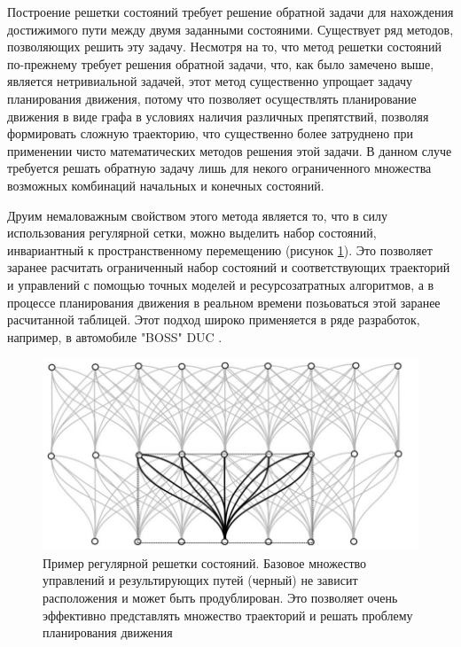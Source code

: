 Построение решетки состояний требует решение обратной задачи для нахождения достижимого пути между двумя заданными
состояними. Существует ряд методов, позволяющих решить эту задачу. Несмотря на то, что метод решетки состояний по-прежнему
требует решения обратной задачи, что, как было замечено выше, является нетривиальной задачей, этот метод существенно
упрощает задачу планирования движения, потому что позволяет осуществлять планирование движения в виде графа в условиях
наличия различных препятствий, позволяя формировать сложную траекторию, что существенно более затруднено при применении
чисто математических методов решения этой задачи. В данном случе требуется решать обратную задачу лишь для некого ограниченного
множества возможных комбинаций начальных и конечных состояний.

Друим немаловажным свойством этого метода является то, что в силу использования регулярной сетки, можно выделить набор
состояний, инвариантный к пространственному перемещению (рисунок \ref{img:lattice_overview}). Это позволяет заранее
расчитать ограниченный набор состояний и соответствующих траекторий и управлений с помощью точных моделей и
ресурсозатратных алгоритмов, а в процессе планирования движения в реальном времени позьоваться этой заранее расчитанной
таблицей. Этот подход широко применяется в ряде разработок, например, в автомобиле "BOSS" DUC \cite{darpa_boss}.

\begin{figure}[h]
    \centering
    \includegraphics[]{images/lattice}
    \caption{Пример регулярной решетки состояний.  Базовое множество управлений и результирующих
             путей (черный) не зависит расположения и может быть продублирован. Это позволяет
             очень эффективно представлять множество траекторий и решать проблему планирования
             движения \cite{motion_planning_lattice_2}}
    \label{img:lattice_overview}
\end{figure}

